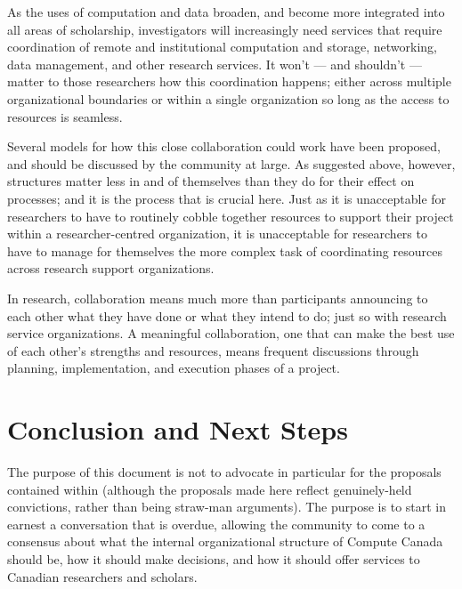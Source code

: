 \documentclass[11pt, letterpaper, twoside]{article}
\begin{document}
As the uses of computation and data broaden, and become more integrated
into all areas of scholarship, investigators will increasingly need
services that require coordination of remote and institutional
computation and storage, networking, data management, and other research
services. It won't --- and shouldn't --- matter to those researchers how
this coordination happens; either across multiple organizational
boundaries or within a single organization so long as the access to
resources is seamless.


Several models for how this close collaboration could work have been
proposed, and should be discussed by the community at large. As
suggested above, however, structures matter less in and of themselves
than they do for their effect on processes; and it is the process that
is crucial here. Just as it is unacceptable for researchers to have to
routinely cobble together resources to support their project within a
researcher-centred organization, it is unacceptable for researchers to
have to manage for themselves the more complex task of coordinating
resources across research support organizations.

In research, collaboration means much more than participants announcing
to each other what they have done or what they intend to do; just so
with research service organizations. A meaningful collaboration, one
that can make the best use of each other's strengths and resources,
means frequent discussions through planning, implementation, and
execution phases of a project.

\section*{Conclusion and Next Steps}
%

The purpose of this document is not to advocate in particular for the
proposals contained within (although the proposals made here reflect
genuinely-held convictions, rather than being straw-man arguments). The
purpose is to start in earnest a conversation that is overdue, allowing
the community to come to a consensus about what the internal
organizational structure of Compute Canada should be, how it should make
decisions, and how it should offer services to Canadian researchers and
scholars.
\end{document}
